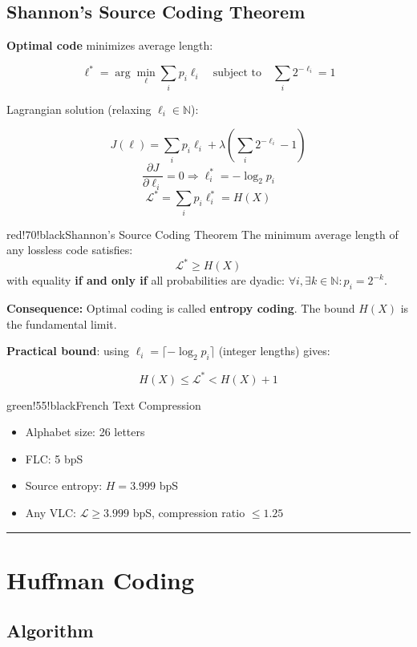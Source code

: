 \subsection{Shannon's Source Coding Theorem}

\textbf{Optimal code} minimizes average length:

\[
\ell^* = \arg\min_\ell \sum_i p_i \ell_i \quad \text{subject to} \quad \sum_i 2^{-\ell_i} = 1
\]

Lagrangian solution (relaxing $\ell_i \in \mathbb{N}$):

\[
J(\ell) = \sum_i p_i \ell_i + \lambda\left(\sum_i 2^{-\ell_i} - 1\right)
\]
\[
\frac{\partial J}{\partial \ell_i} = 0 \Rightarrow \ell_i^* = -\log_2 p_i
\]
\[
\mathcal{L}^* = \sum_i p_i \ell_i^* = H(X)
\]

\begin{calloutbox}{red!70!black}{Shannon's Source Coding Theorem}
The minimum average length of any lossless code satisfies:
\[
\mathcal{L}^* \geq H(X)
\]
with equality \textbf{if and only if} all probabilities are dyadic: $\forall i, \exists k \in \mathbb{N}: p_i = 2^{-k}$.

\textbf{Consequence:} Optimal coding is called \textbf{entropy coding}. The bound $H(X)$ is the fundamental limit.
\end{calloutbox}

\textbf{Practical bound}: using $\ell_i = \lceil -\log_2 p_i \rceil$ (integer lengths) gives:

\[
H(X) \leq \mathcal{L}^* < H(X) + 1
\]

\begin{calloutbox}{green!55!black}{French Text Compression}
\begin{itemize}
\item Alphabet size: 26 letters
\item FLC: 5 bpS
\item Source entropy: $H = 3.999$ bpS
\item Any VLC: $\mathcal{L} \geq 3.999$ bpS, compression ratio $\leq 1.25$
\end{itemize}
\end{calloutbox}

\bigskip\hrule\bigskip

\section{Huffman Coding}
\subsection{Algorithm}

